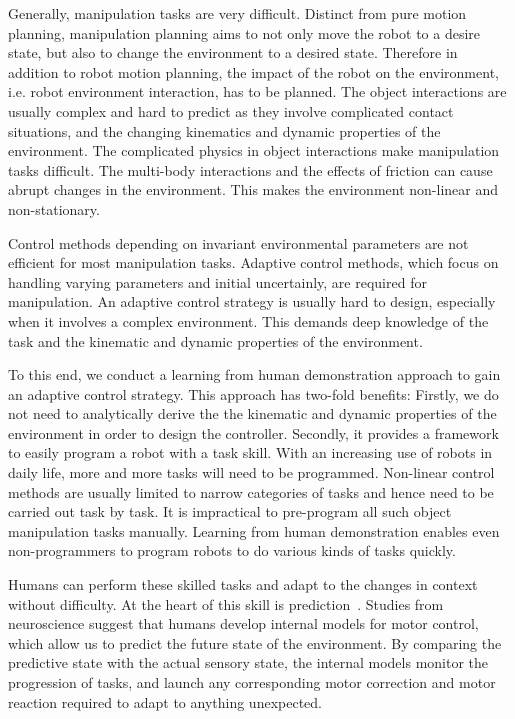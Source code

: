 Generally, manipulation tasks are very difficult. Distinct from pure motion planning, manipulation planning aims to not only move the robot to a desire state, but also to change the environment to a desired state. Therefore in addition to robot motion planning, the impact of the robot on the environment, i.e. robot environment interaction, has to be planned. The object interactions are usually complex and hard to predict as they involve complicated contact situations, and the changing kinematics and dynamic properties of the environment. The complicated physics in object interactions make manipulation tasks difficult. The multi-body interactions and the effects of friction can cause abrupt changes in the environment. This makes the environment non-linear and non-stationary.

Control methods depending on invariant
environmental parameters are not efficient for most manipulation tasks. Adaptive control methods, which focus on handling varying parameters and initial uncertainly, are required for manipulation. An adaptive control strategy is usually hard to design, especially when it involves a complex environment. This demands deep knowledge of the task and the kinematic and dynamic properties of the environment.

To this end, we conduct a learning from human demonstration approach to gain an adaptive control strategy. This approach has two-fold benefits: Firstly, we do not need to analytically derive the the kinematic and dynamic properties of the environment in order to design the controller. Secondly, it provides a framework to easily program a robot with a task skill. With an increasing use of robots in daily life, more and more tasks will need to be programmed. Non-linear control methods are usually limited to narrow categories of tasks and hence need to be carried out task by task. It is impractical to pre-program all such object manipulation tasks manually. Learning from human demonstration enables even non-programmers to program robots to do various kinds of tasks quickly.

Humans can perform these skilled tasks and adapt to the changes in context without difficulty. At the heart of this skill is prediction~\cite{flanagan2006control}. Studies from neuroscience
suggest that humans develop internal models for motor control, which
allow us to predict the future state of the environment. By comparing
the predictive state with the actual sensory state, the internal
models monitor the progression of  tasks, and launch any
corresponding motor correction and motor reaction required to
adapt to anything unexpected.

